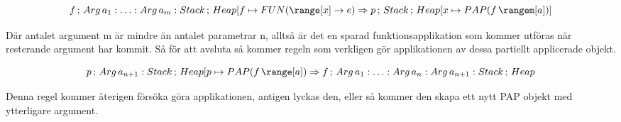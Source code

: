 \documentclass[../Core]{subfiles}
\begin{document}
\[
f\,;\, Arg\, a_{1}:\ldots:Arg\, a_{m}:Stack\,;\, Heap[f\mapsto\FUN{\range[x]}e\Rightarrow p\,;\, Stack\,;\, Heap[x\mapsto\PAP f{\rangem[a]}]\]


Där antalet argument m är mindre än antalet parametrar n, alltså är det en sparad funktionsapplikation som kommer
utföras när resterande argument har kommit. Så för att avsluta så
kommer regeln som verkligen gör applikationen av dessa partiellt applicerade
objekt.

\[
p\,;\, Arg\, a_{n+1}:Stack\,;\, Heap[p\mapsto\PAP f{\range[a]}\Rightarrow f\,;\, Arg\, a_{1}:\ldots:Arg\, a_{n}:Arg\, a_{n+1}:Stack\,;\, Heap\]


Denna regel kommer återigen försöka göra applikationen, antigen lyckas
den, eller så kommer den skapa ett nytt PAP objekt med ytterligare
argument.
\end{document}

